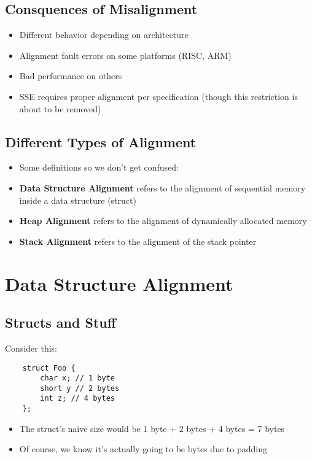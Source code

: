 \documentclass{beamer}
\begin{document}
\subsection{Consquences of Misalignment}
\begin{frame}{\insertsection}{\insertsubsection}
	\begin{itemize}
		\item Different behavior depending on architecture
		\item Alignment fault errors on some platforms (RISC, ARM)
		\item Bad performance on others
		\item SSE requires proper alignment per specification (though this restriction is about to be removed)
	\end{itemize}
\end{frame}

\subsection{Different Types of Alignment}
\begin{frame}{\insertsection}{\insertsubsection}
	\begin{itemize}
		\item Some definitions so we don't get confused:\pause
        \item \textbf{Data Structure Alignment} refers to the alignment of sequential memory inside
            a data structure (struct) \pause
        \item \textbf{Heap Alignment} refers to the alignment of dynamically allocated memory\pause
        \item \textbf{Stack Alignment} refers to the alignment of the stack pointer
	\end{itemize}
\end{frame}

\section{Data Structure Alignment}
\subsection{Structs and Stuff}
\begin{frame}[fragile]{\insertsection}{\insertsubsection}
    \pause
    Consider this:
    \begin{verbatim}
    struct Foo {
        char x; // 1 byte
        short y // 2 bytes
        int z; // 4 bytes
    };
    \end{verbatim}
    \begin{itemize}
        \item The struct's naive size would be 1 byte + 2 bytes + 4 bytes = 7 bytes\pause
        \item Of course, we know it's actually going to be  bytes due to padding
    \end{itemize}
\end{frame}
\end{document}
